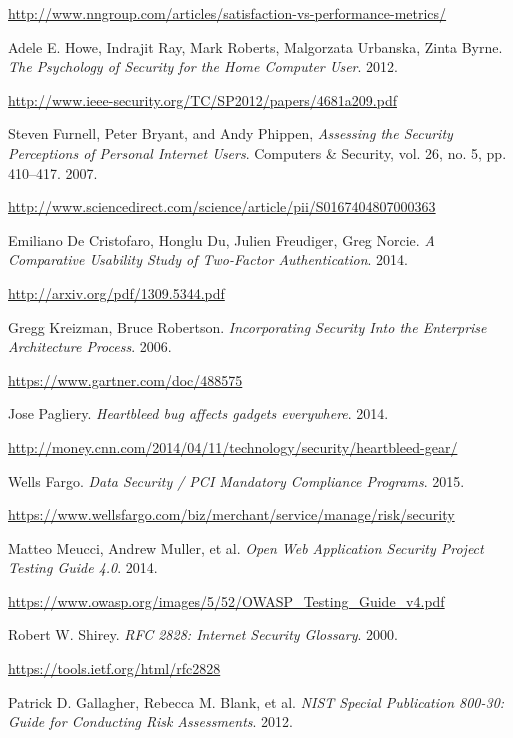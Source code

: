 \documentclass[a4paper,12pt]{article}
\newcommand{\refspace}{\vspace{-2mm}}
\begin{document}
\begin{thebibliography}{}
		\refspace
		\url{http://www.nngroup.com/articles/satisfaction-vs-performance-metrics/}
		
		Adele E. Howe, Indrajit Ray, Mark Roberts, Malgorzata Urbanska, Zinta Byrne. \textit{The Psychology of Security for the Home Computer User}. 2012.
		
		\refspace
		\url{http://www.ieee-security.org/TC/SP2012/papers/4681a209.pdf}
		
		Steven Furnell, Peter Bryant, and Andy Phippen, \textit{Assessing the Security Perceptions of Personal Internet Users}. Computers \& Security, vol. 26, no. 5, pp. 410–417. 2007.
		
		\refspace
		\url{http://www.sciencedirect.com/science/article/pii/S0167404807000363}
		
		Emiliano De Cristofaro, Honglu Du, Julien Freudiger, Greg Norcie. \textit{A Comparative Usability Study of Two-Factor Authentication}. 2014.
		
		\refspace
		\url{http://arxiv.org/pdf/1309.5344.pdf}
		
		Gregg Kreizman, Bruce Robertson. \textit{Incorporating Security Into the Enterprise Architecture Process}. 2006.
		
		\refspace
		\url{https://www.gartner.com/doc/488575}
		
		Jose Pagliery. \textit{Heartbleed bug affects gadgets everywhere}. 2014.
		
		\refspace
		\url{http://money.cnn.com/2014/04/11/technology/security/heartbleed-gear/}
		
		Wells Fargo. \textit{Data Security / PCI Mandatory Compliance Programs}. 2015.
		
		\refspace
		\url{https://www.wellsfargo.com/biz/merchant/service/manage/risk/security}
		
		Matteo Meucci, Andrew Muller, et al. \textit{Open Web Application Security Project Testing Guide 4.0}. 2014.
		
		\refspace
		\url{https://www.owasp.org/images/5/52/OWASP_Testing_Guide_v4.pdf}
		
		Robert W. Shirey. \textit{RFC 2828: Internet Security Glossary}. 2000.
		
		\refspace
		\url{https://tools.ietf.org/html/rfc2828}
		
		Patrick D. Gallagher, Rebecca M. Blank, et al. \textit{NIST Special Publication 800-30: Guide for Conducting Risk Assessments}. 2012.
		

\end{thebibliography}
\end{document}
